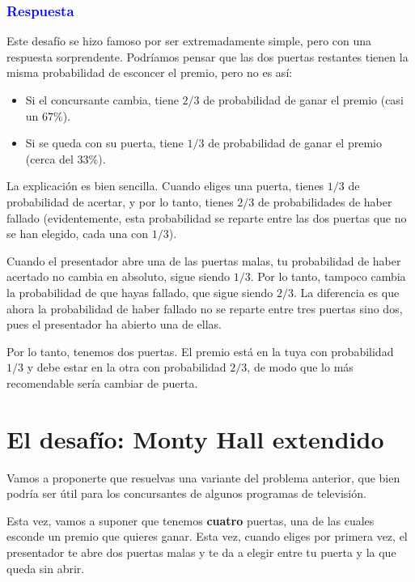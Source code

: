 \begin{multicols}{2}
\subsubsection*{\textcolor{blue}{Respuesta}}
Este desafío se hizo famoso por ser extremadamente simple, pero con una respuesta sorprendente. Podríamos pensar que las dos puertas restantes tienen la misma probabilidad de esconcer el premio, pero no es así:

\begin{mybox}
  \begin{itemize}[leftmargin=0.2cm]
    \item Si el concursante cambia, tiene $2/3$ de probabilidad de ganar el premio (casi un $67\%$).
    \item Si se queda con su puerta, tiene $1/3$  de probabilidad de ganar el premio (cerca del $33\%$).
  \end{itemize}
\end{mybox}
La explicación es bien sencilla. Cuando eliges una puerta, tienes $1/3$ de probabilidad de acertar, y por lo tanto, tienes $2/3$ de probabilidades de haber fallado (evidentemente, esta probabilidad se reparte entre las dos puertas que no se han elegido, cada una con $1/3$).

Cuando el presentador abre una de las puertas malas, tu probabilidad de haber acertado no cambia en absoluto, sigue siendo $1/3$. Por lo tanto, tampoco cambia la probabilidad de que hayas fallado, que sigue siendo $2/3$. La diferencia es que ahora la probabilidad de haber fallado no se reparte entre tres puertas sino dos, pues el presentador ha abierto una de ellas.

Por lo tanto, tenemos dos puertas. El premio está en la tuya con probabilidad $1/3$ y debe estar en la otra con probabilidad $2/3$, de modo que lo más recomendable sería cambiar de puerta.


\section{El desafío: Monty Hall extendido}
Vamos a proponerte que resuelvas una variante del problema anterior, que bien podría ser útil para los concursantes de algunos programas de televisión.

Esta vez, vamos a suponer que tenemos \textbf{cuatro} puertas, una de las cuales esconde un premio que quieres ganar. Esta vez, cuando eliges por primera vez, el presentador te abre dos puertas malas y te da a elegir entre tu puerta y la que queda sin abrir.


\end{multicols}
